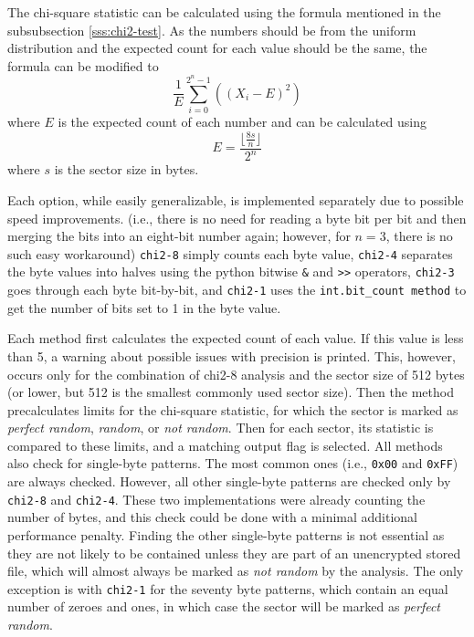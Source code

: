\documentclass[
  digital, %
  color,   %
  oneside, %
  lof,     %
  nolot,     %
]{fithesis4}
\begin{document}
The chi-square statistic can be calculated using the formula mentioned in the subsubsection \ref{sss:chi2-test}.
As the numbers should be from the uniform distribution and the expected count for each value should be the same, the formula can be modified to
\begin{equation}
  \frac{1}{E}\sum_{i = 0}^{2^n - 1}((X_i - E)^2)
\end{equation}
where $E$ is the expected count of each number and can be calculated using 
\begin{equation}
    E = \frac{\lfloor\frac{8s}{n}\rfloor}{2^n}
\end{equation}
where $s$ is the sector size in bytes.

Each option, while easily generalizable, is implemented separately due to possible speed improvements. 
(i.e., there is no need for reading a byte bit per bit and then merging the bits into an eight-bit number again; however, for $n = 3$, there is no such easy workaround)
\texttt{chi2-8} simply counts each byte value, \texttt{chi2-4} separates the byte values into halves using the python bitwise \texttt{\&} and \texttt{>{>}} operators, \texttt{chi2-3} goes through each byte bit-by-bit, and \texttt{chi2-1} uses the \texttt{int.bit\_count method} to get the number of bits set to 1 in the byte value.

Each method first calculates the expected count of each value.
If this value is less than 5, a warning about possible issues with precision\cite{knuth81} is printed.
This, however, occurs only for the combination of chi2-8 analysis and the sector size of 512 bytes (or lower, but 512 is the smallest commonly used sector size).
Then the method precalculates limits for the chi-square statistic, for which the sector is marked as \emph{perfect random}, \emph{random}, or \emph{not random}.
Then for each sector, its statistic is compared to these limits, and a matching output flag is selected.
All methods also check for single-byte patterns. The most common ones (i.e., \texttt{0x00} and \texttt{0xFF}) are always checked.
However, all other single-byte patterns are checked only by \texttt{chi2-8} and \texttt{chi2-4}.
These two implementations were already counting the number of bytes, and this check could be done with a minimal additional performance penalty.
Finding the other single-byte patterns is not essential as they are not likely to be contained unless they are part of an unencrypted stored file, which will almost always be marked as \emph{not random} by the analysis.
The only exception is with \texttt{chi2-1} for the seventy byte patterns, which contain an equal number of zeroes and ones, in which case the sector will be marked as \emph{perfect random}.
\end{document}
